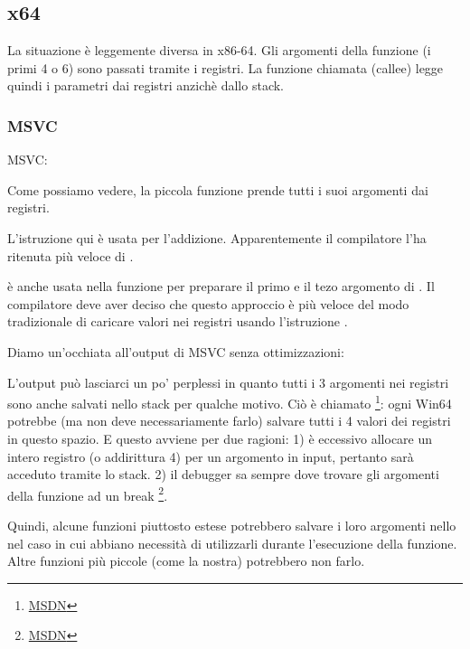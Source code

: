 \subsection{x64}


La situazione è leggemente diversa in x86-64. Gli argomenti della funzione (i primi 4 o 6) 
sono passati tramite i registri. La funzione chiamata (\gls{callee}) legge quindi i parametri dai registri anzichè dallo stack.

\subsubsection{MSVC}

\Optimizing MSVC:



Come possiamo vedere, la piccola funzione \ttf prende tutti i suoi argomenti dai registri.

L'istruzione \LEA qui è usata per l'addizione. Apparentemente il compilatore l'ha ritenuta più veloce di .

\LEA è anche usata nella funzione \main per preparare il primo e il tezo argomento di \ttf.
Il compilatore deve aver deciso che questo approccio è più veloce del modo tradizionale di caricare valori nei registri usando l'istruzione \MOV.

Diamo un'occhiata all'output di MSVC senza ottimizzazioni:



L'output può lasciarci un po' perplessi in quanto tutti i 3 argomenti nei registri sono anche salvati nello stack per qualche motivo. 
\label{shadow_space}
Ciò è chiamato 
\footnote{\href{http://go.yurichev.com/17256}{MSDN}}: 
ogni Win64 potrebbe (ma non deve necessariamente farlo) salvare tutti i 4 valori dei registri in questo spazio.
E questo avviene per due ragioni: 
1) è eccessivo allocare un intero registro (o addirittura 4) per un argomento in input, pertanto sarà acceduto tramite lo stack.
2) il debugger sa sempre dove trovare gli argomenti della funzione ad un break
\footnote{\href{http://go.yurichev.com/17257}{MSDN}}.

Quindi, alcune funzioni piuttosto estese potrebbero salvare i loro argomenti nello  nel caso in cui 
abbiano necessità di utilizzarli durante l'esecuzione della funzione. Altre funzioni più piccole (come la nostra) potrebbero non farlo.

